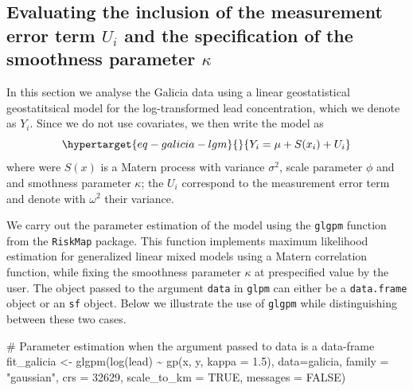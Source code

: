 \documentclass[
  letterpaper,
]{krantz}
\newenvironment{Shaded}{\begin{snugshade}}{\end{snugshade}}
\newcommand{\AttributeTok}[1]{\textcolor[rgb]{0.40,0.45,0.13}{#1}}
\newcommand{\CommentTok}[1]{\textcolor[rgb]{0.37,0.37,0.37}{#1}}
\newcommand{\ConstantTok}[1]{\textcolor[rgb]{0.56,0.35,0.01}{#1}}
\newcommand{\DecValTok}[1]{\textcolor[rgb]{0.68,0.00,0.00}{#1}}
\newcommand{\FloatTok}[1]{\textcolor[rgb]{0.68,0.00,0.00}{#1}}
\newcommand{\FunctionTok}[1]{\textcolor[rgb]{0.28,0.35,0.67}{#1}}
\newcommand{\NormalTok}[1]{\textcolor[rgb]{0.00,0.23,0.31}{#1}}
\newcommand{\OtherTok}[1]{\textcolor[rgb]{0.00,0.23,0.31}{#1}}
\newcommand{\SpecialCharTok}[1]{\textcolor[rgb]{0.37,0.37,0.37}{#1}}
\newcommand{\StringTok}[1]{\textcolor[rgb]{0.13,0.47,0.30}{#1}}
\begin{document}
\hypertarget{sec-glm-parest}{%
\subsection{\texorpdfstring{Evaluating the inclusion of the measurement
error term \(U_i\) and the specification of the smoothness parameter
\(\kappa\)}{Evaluating the inclusion of the measurement error term U\_i and the specification of the smoothness parameter \textbackslash kappa}}\label{sec-glm-parest}}

In this section we analyse the Galicia data using a linear
geostatistical geostatitsical model for the log-transformed lead
concentration, which we denote as \(Y_i\). Since we do not use
covariates, we then write the model as
\begin{equation}\protect\hypertarget{eq-galicia-lgm}{}{
Y_i = \mu + S(x_i) + U_i
}\label{eq-galicia-lgm}\end{equation} where were \(S(x)\) is a Matern
process with variance \(\sigma^2\), scale parameter \(\phi\) and and
smothness parameter \(\kappa\); the \(U_i\) correspond to the
measurement error term and denote with \(\omega^2\) their variance.

We carry out the parameter estimation of the model using the
\texttt{glgpm} function from the \texttt{RiskMap} package. This function
implements maximum likelihood estimation for generalized linear mixed
models using a Matern correlation function, while fixing the smoothness
parameter \(\kappa\) at prespecified value by the user. The object
passed to the argument \texttt{data} in \texttt{glpm} can either be a
\texttt{data.frame} object or an \texttt{sf} object. Below we illustrate
the use of \texttt{glgpm} while distinguishing between these two cases.

\begin{Shaded}
\begin{Highlighting}[]
\CommentTok{\# Parameter estimation when the argument passed to \textasciigrave{}data\textasciigrave{} is a data{-}frame}
\NormalTok{fit\_galicia }\OtherTok{\textless{}{-}} 
\FunctionTok{glgpm}\NormalTok{(}\FunctionTok{log}\NormalTok{(lead) }\SpecialCharTok{\textasciitilde{}} \FunctionTok{gp}\NormalTok{(x, y, }\AttributeTok{kappa =} \FloatTok{1.5}\NormalTok{), }\AttributeTok{data=}\NormalTok{galicia, }\AttributeTok{family =} \StringTok{"gaussian"}\NormalTok{,}
      \AttributeTok{crs =} \DecValTok{32629}\NormalTok{, }\AttributeTok{scale\_to\_km =} \ConstantTok{TRUE}\NormalTok{, }\AttributeTok{messages =} \ConstantTok{FALSE}\NormalTok{)}
\end{Highlighting}
\end{Shaded}
\end{document}
